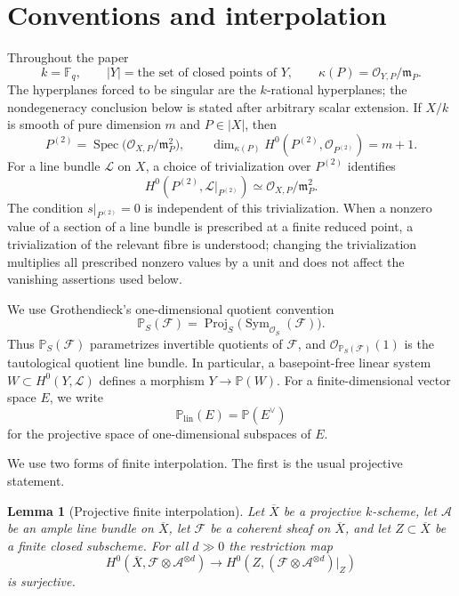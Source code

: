 \documentclass{lms}
\newtheorem{lemma}[theorem]{Lemma}
\DeclareMathOperator{\Spec}{Spec}
\DeclareMathOperator{\Proj}{Proj}
\newcommand{\F}{\mathbb F}
\newcommand{\PP}{\mathbb P}
\newcommand{\Ample}{\mathcal A}
\newcommand{\OO}{\mathcal O}
\newcommand{\LL}{\mathcal L}
\newcommand{\FF}{\mathcal F}
\newcommand{\kk}{\kappa}
\newcommand{\mm}{\mathfrak m}
\newcommand{\barX}{\overline{X}}
\begin{document}
\section{Conventions and interpolation}\label{sec:conventions}

Throughout the paper
\[
        k=\F_q,
        \qquad
        |Y|=\text{the set of closed points of }Y,
        \qquad
        \kk(P)=\OO_{Y,P}/\mm_P.
\]
The hyperplanes forced to be singular are the $k$-rational hyperplanes; the nondegeneracy conclusion below is stated after arbitrary scalar extension.  If $X/k$ is smooth of pure dimension $m$ and $P\in |X|$, then
\[
        P^{(2)}=\Spec\bigl(\OO_{X,P}/\mm_P^2\bigr),
        \qquad
        \dim_{\kk(P)}H^0(P^{(2)},\OO_{P^{(2)}})=m+1.
\]
For a line bundle $\LL$ on $X$, a choice of trivialization over $P^{(2)}$ identifies
\[
        H^0(P^{(2)},\LL|_{P^{(2)}})
        \simeq \OO_{X,P}/\mm_P^2.
\]
The condition $s|_{P^{(2)}}=0$ is independent of this trivialization.  When a nonzero value of a section of a line bundle is prescribed at a finite reduced point, a trivialization of the relevant fibre is understood; changing the trivialization multiplies all prescribed nonzero values by a unit and does not affect the vanishing assertions used below.

We use Grothendieck's one-dimensional quotient convention
\[
        \PP_S(\mathcal F)=\Proj_S\bigl(\operatorname{Sym}_{\OO_S}(\mathcal F)\bigr).
\]
Thus \(\PP_S(\mathcal F)\) parametrizes invertible quotients of \(\mathcal F\), and
\(\OO_{\PP_S(\mathcal F)}(1)\) is the tautological quotient line bundle.  In particular, a basepoint-free linear system
\(W\subset H^0(Y,\mathcal L)\) defines a morphism \(Y\to\PP(W)\).  For a finite-dimensional vector space \(E\), we write
\[
        \PP_{\mathrm{lin}}(E)=\PP(E^\vee)
\]
for the projective space of one-dimensional subspaces of \(E\).

We use two forms of finite interpolation.  The first is the usual projective statement.

\begin{lemma}[Projective finite interpolation]\label{lem:interpolation-projective}
Let $\barX$ be a projective $k$-scheme, let $\Ample$ be an ample line bundle on $\barX$, let $\FF$ be a coherent sheaf on $\barX$, and let $Z\subset \barX$ be a finite closed subscheme.  For all $d\gg0$ the restriction map
\[
        H^0(\barX,\FF\otimes\Ample^{\otimes d})
        \longrightarrow
        H^0(Z,(\FF\otimes\Ample^{\otimes d})|_Z)
\]
is surjective.
\end{lemma}
\end{document}
